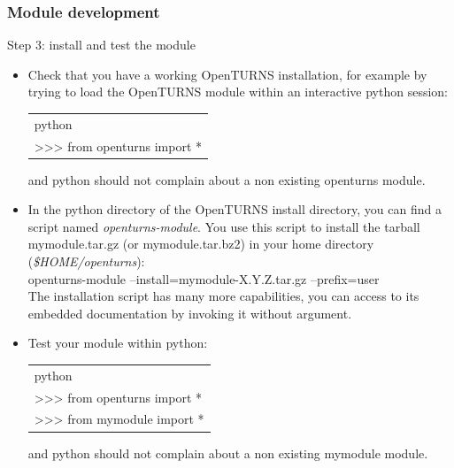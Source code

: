 \documentclass[8pt]{beamer}
\begin{document}
\begin{frame}
  \frametitle{Module development}
  \begin{block}{Step 3: install and test the module}
    \begin{itemize}
    \item Check that you have a working OpenTURNS installation, for example by trying to load the OpenTURNS module within an interactive python session:
      \begin{tabular}{l}
        \ttfamily python\\
        \ttfamily >>> from openturns import *\\
      \end{tabular}

      and python should not complain about a non existing openturns module.
    \item In the python directory of the OpenTURNS install directory, you can find a script named {\itshape openturns-module}. You use this script to install the tarball mymodule.tar.gz (or mymodule.tar.bz2) in your home directory ({\itshape \$HOME/openturns}):\\
      {\ttfamily openturns-module --install=mymodule-X.Y.Z.tar.gz --prefix=user}\\
      The installation script has many more capabilities, you can access to its embedded documentation by invoking it without argument.
    \item Test your module within python:\\
      \begin{tabular}{l}
        \ttfamily python \\
        \ttfamily >>> from openturns import * \\
        \ttfamily >>> from mymodule import * \\
      \end{tabular}

      and python should not complain about a non existing mymodule module.
    \end{itemize}
  \end{block}
\end{frame}
\end{document}
